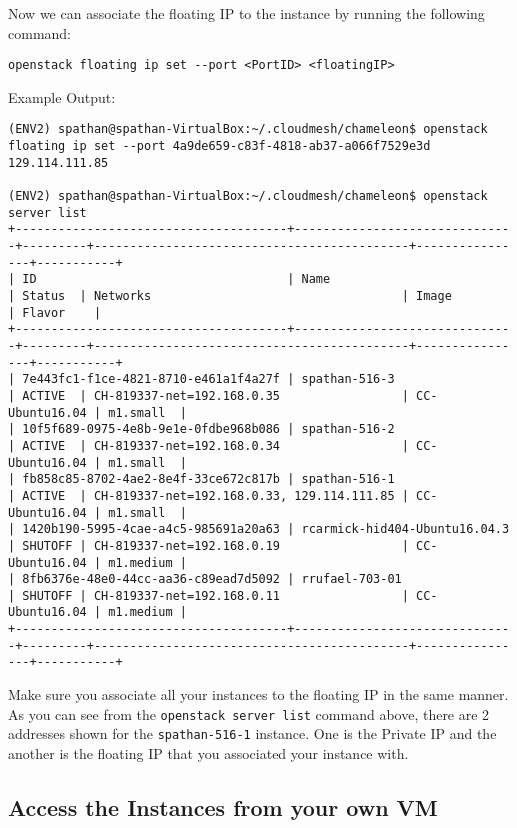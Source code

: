 Now we can associate the floating IP to the instance by running the
following command:

\texttt{openstack\ floating\ ip\ set\ -\/-port\ \textless{}PortID\textgreater{}\ \textless{}floatingIP\textgreater{}}

Example Output:

\begin{lstlisting}
(ENV2) spathan@spathan-VirtualBox:~/.cloudmesh/chameleon$ openstack floating ip set --port 4a9de659-c83f-4818-ab37-a066f7529e3d 129.114.111.85

(ENV2) spathan@spathan-VirtualBox:~/.cloudmesh/chameleon$ openstack server list
+--------------------------------------+-------------------------------+---------+--------------------------------------------+----------------+-----------+
| ID                                   | Name                          | Status  | Networks                                   | Image          | Flavor    |
+--------------------------------------+-------------------------------+---------+--------------------------------------------+----------------+-----------+
| 7e443fc1-f1ce-4821-8710-e461a1f4a27f | spathan-516-3                 | ACTIVE  | CH-819337-net=192.168.0.35                 | CC-Ubuntu16.04 | m1.small  |
| 10f5f689-0975-4e8b-9e1e-0fdbe968b086 | spathan-516-2                 | ACTIVE  | CH-819337-net=192.168.0.34                 | CC-Ubuntu16.04 | m1.small  |
| fb858c85-8702-4ae2-8e4f-33ce672c817b | spathan-516-1                 | ACTIVE  | CH-819337-net=192.168.0.33, 129.114.111.85 | CC-Ubuntu16.04 | m1.small  |
| 1420b190-5995-4cae-a4c5-985691a20a63 | rcarmick-hid404-Ubuntu16.04.3 | SHUTOFF | CH-819337-net=192.168.0.19                 | CC-Ubuntu16.04 | m1.medium |
| 8fb6376e-48e0-44cc-aa36-c89ead7d5092 | rrufael-703-01                | SHUTOFF | CH-819337-net=192.168.0.11                 | CC-Ubuntu16.04 | m1.medium |
+--------------------------------------+-------------------------------+---------+--------------------------------------------+----------------+-----------+
\end{lstlisting}

Make sure you associate all your instances to the floating IP in the
same manner. As you can see from the \texttt{openstack\ server\ list}
command above, there are 2 addresses shown for the
\texttt{spathan-516-1} instance. One is the Private IP and the another
is the floating IP that you associated your instance with.

\subsection{Access the Instances from your own VM}

